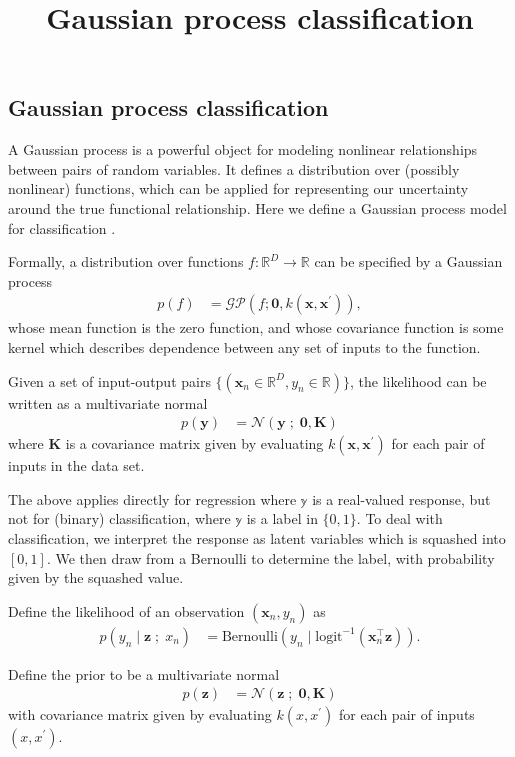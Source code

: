 \title{Gaussian process classification}

\subsection{Gaussian process classification}

A Gaussian process is a powerful object for modeling nonlinear
relationships between pairs of random variables. It defines a distribution over
(possibly nonlinear) functions, which can be applied for representing
our uncertainty around the true functional relationship.
Here we define a Gaussian process model for classification
\citep{rasmussen2006gaussian}.

Formally, a distribution over functions $f:\mathbb{R}^D\to\mathbb{R}$ can be specified
by a Gaussian process
\begin{align*}
  p(f)
  &=
  \mathcal{GP}(f; \mathbf{0}, k(\mathbf{x}, \mathbf{x}^\prime)),
\end{align*}
whose mean function is the zero function, and whose covariance
function is some kernel which describes dependence between
any set of inputs to the function.

Given a set of input-output pairs
$\{(\mathbf{x}_n\in\mathbb{R}^D,y_n\in\mathbb{R})\}$,
the likelihood can be written as a multivariate normal
\begin{align*}
  p(\mathbf{y})
  &=
  \mathcal{N}(\mathbf{y} \;;\; \mathbf{0}, \mathbf{K})
\end{align*}
where $\mathbf{K}$ is a covariance matrix given by evaluating
$k(\mathbf{x}, \mathbf{x}^\prime)$ for each pair of inputs in the data
set.

The above applies directly for regression where $\mathbb{y}$ is a
real-valued response, but not for (binary) classification, where $\mathbb{y}$
is a label in $\{0,1\}$. To deal with classification, we interpret the
response as latent variables which is squashed into $[0,1]$. We then
draw from a Bernoulli to determine the label, with probability given
by the squashed value.

Define the likelihood of an observation $(\mathbf{x}_n, y_n)$ as
\begin{align*}
  p(y_n \mid \mathbf{z} \;;\; x_n)
  &=
  \text{Bernoulli}(y_n \mid \text{logit}^{-1}(\mathbf{x}_n^\top \mathbf{z})).
\end{align*}

Define the prior to be a multivariate normal
\begin{align*}
  p(\mathbf{z})
  &=
  \mathcal{N}(\mathbf{z} \;;\; \mathbf{0}, \mathbf{K})
\end{align*}
with
covariance matrix given by evaluating $k(x, x^\prime)$ for each pair of inputs
$(x, x^\prime)$.

